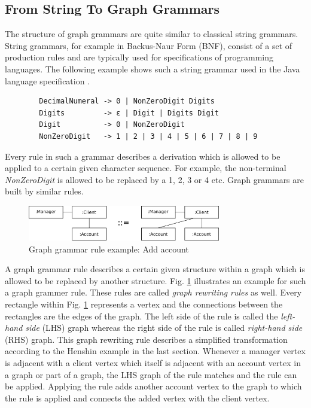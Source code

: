 \documentclass[runningheads]{llncs}
\begin{document}
\subsection{From String To Graph Grammars}
The structure of graph grammars are quite similar to classical string grammars. String grammars, for example in Backus-Naur Form (BNF), consist of a set of production rules and are typically used for specifications of programming languages. The following example \cite{DBLP:phd/de/Konigs2009} shows such a string grammar used in the Java language specification \cite{Gosling:1996:JLS:560667}.

\begin{center}
	\begin{lstlisting}
		DecimalNumeral -> 0 | NonZeroDigit Digits
		Digits         -> ε | Digit | Digits Digit
		Digit          -> 0 | NonZeroDigit
		NonZeroDigit   -> 1 | 2 | 3 | 4 | 5 | 6 | 7 | 8 | 9
	\end{lstlisting}
\end{center}

\noindent
Every rule in such a grammar describes a derivation which is allowed to be applied to a certain given character sequence. For example, the non-terminal \textit{NonZeroDigit} is allowed to be replaced by a 1, 2, 3 or 4 etc. Graph grammars are built by similar rules. 

\begin{figure}[H]
	\centering
	\includegraphics[width=0.75\textwidth]{grammar_rule_example}
	\caption{Graph grammar rule example: Add account}
	\label{fig:graph-grammar-rule-add-account}
\end{figure}

\noindent
A graph grammar rule describes a certain given structure within a graph which is allowed to be replaced by another structure. Fig. \ref{fig:graph-grammar-rule-add-account} illustrates an example for such a graph grammer rule. These rules are called \textit{graph rewriting rules} as well. Every rectangle within Fig. \ref{fig:graph-grammar-rule-add-account} represents a vertex and the connections between the rectangles are the edges of the graph. The left side of the rule is called the \textit{left-hand side} (LHS) graph whereas the right side of the rule is called \textit{right-hand side} (RHS) graph. This graph rewriting rule describes a simplified transformation according to the Henshin example in the last section. Whenever a manager vertex is adjacent with a client vertex which itself is adjacent with an account vertex in a graph or part of a graph, the LHS graph of the rule matches and the rule can be applied. Applying the rule adds another account vertex to the graph to which the rule is applied and connects the added vertex with the client vertex. 
\end{document}
